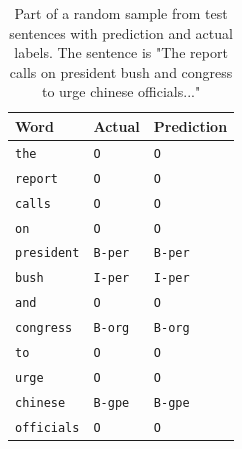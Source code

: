 \documentclass[sigconf, nonacm, natbib, screen, balance=False]{acmart}
\begin{document}
\begin{table}
  \caption{Part of a random sample from test sentences with prediction and actual labels. The sentence is "The report calls on president bush and congress to urge chinese officials..."}
  \label{tbl:end_results}
  \begin{tabular}{lll}  
    \hline
    Word & Actual & Prediction  \\\hline
    \verb!the! & \verb!O! & \verb!O! \\
    \verb!report! & \verb!O! & \verb!O!  \\
    \verb!calls! & \verb!O! & \verb!O!  \\
    \verb!on! & \verb!O! &  \verb!O! \\
    \verb!president! & \verb!B-per! & \verb!B-per! \\
    \verb!bush! & \verb!I-per! & \verb!I-per! \\
    \verb!and! & \verb!O! & \verb!O!  \\
    \verb!congress! & \verb!B-org! &  \verb!B-org!\\
    \verb!to! & \verb!O! & \verb!O!  \\
    \verb!urge! & \verb!O! & \verb!O! \\
    \verb!chinese! & \verb!B-gpe! & \verb!B-gpe! \\
    \verb!officials! & \verb!O! & \verb!O!  \\\hline
  \end{tabular}
\end{table}
\end{document}
